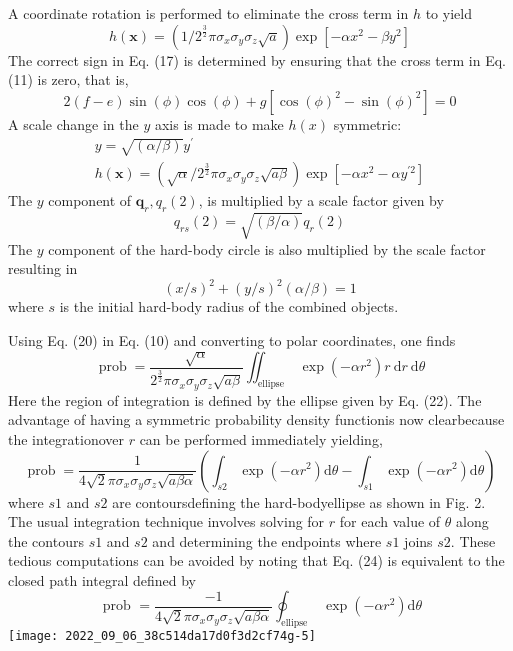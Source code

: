 \documentclass[10pt]{article}
\begin{document}
A coordinate rotation is performed to eliminate the cross term in $h$ to yield
$$
h(\boldsymbol{x})=\left(1 / 2^{\frac{3}{2}} \pi \sigma_{x} \sigma_{y} \sigma_{z} \sqrt{a}\right) \exp \left[-\alpha x^{2}-\beta y^{2}\right]
$$
The correct sign in Eq. (17) is determined by ensuring that the cross term in Eq. (11) is zero, that is,
$$
2(f-e) \sin (\phi) \cos (\phi)+g\left[\cos (\phi)^{2}-\sin (\phi)^{2}\right]=0
$$
A scale change in the $y$ axis is made to make $h(x)$ symmetric:
$$
\begin{gathered}
y=\sqrt{(\alpha / \beta)} y^{\prime} \\
h(\boldsymbol{x})=\left(\sqrt{\alpha} / 2^{\frac{3}{2}} \pi \sigma_{x} \sigma_{y} \sigma_{z} \sqrt{a \beta}\right) \exp \left[-\alpha x^{2}-\alpha y^{\prime 2}\right]
\end{gathered}
$$
The $y$ component of $\boldsymbol{q}_{r}, q_{r}(2)$, is multiplied by a scale factor given by
$$
q_{r s}(2)=\sqrt{(\beta / \alpha)} q_{r}(2)
$$
The $y$ component of the hard-body circle is also multiplied by the scale factor resulting in
$$
(x / s)^{2}+(y / s)^{2}(\alpha / \beta)=1
$$
where $s$ is the initial hard-body radius of the combined objects.

Using Eq. (20) in Eq. (10) and converting to polar coordinates, one finds
$$
\operatorname{prob}=\frac{\sqrt{\alpha}}{2^{\frac{3}{2}} \pi \sigma_{x} \sigma_{y} \sigma_{z} \sqrt{a \beta}} \iint_{\text {ellipse }} \exp \left(-\alpha r^{2}\right) r \mathrm{~d} r \mathrm{~d} \theta
$$
Here the region of integration is defined by the ellipse given by Eq. (22). The advantage of having a symmetric probability density functionis now clearbecause the integrationover $r$ can be performed immediately yielding,
$$
\operatorname{prob}=\frac{1}{4 \sqrt{2} \pi \sigma_{x} \sigma_{y} \sigma_{z} \sqrt{a \beta \alpha}}\left(\int_{s 2} \exp \left(-\alpha r^{2}\right) \mathrm{d} \theta-\int_{s 1} \exp \left(-\alpha r^{2}\right) \mathrm{d} \theta\right)
$$
where $s 1$ and $s 2$ are contoursdefining the hard-bodyellipse as shown in Fig. 2. The usual integration technique involves solving for $r$ for each value of $\theta$ along the contours $s 1$ and $s 2$ and determining the endpoints where $s 1$ joins $s 2$. These tedious computations can be avoided by noting that Eq. (24) is equivalent to the closed path integral defined by
$$
\text { prob }=\frac{-1}{4 \sqrt{2} \pi \sigma_{x} \sigma_{y} \sigma_{z} \sqrt{a \beta \alpha}} \oint_{\text {ellipse }} \exp \left(-\alpha r^{2}\right) \mathrm{d} \theta
$$
\texttt{[image: 2022\_09\_06\_38c514da17d0f3d2cf74g-5]}
\end{document}
